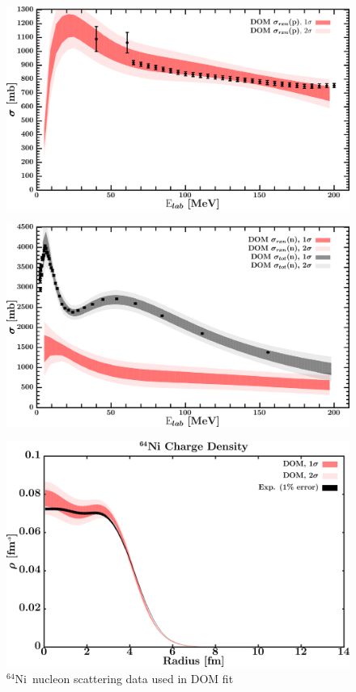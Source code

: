 \documentclass[twocolumn,secnumarabic,amssymb, nobibnotes, aps, prl,
superscriptaddress, nobalancelastpage, draft]{revtex4}
\newcommand{\niFour}{\ensuremath{^{64}}N\lowercase{i}}
\begin{document}
\begin{figure}[!htb]
\begin{minipage}{0.4\linewidth}
        \includegraphics[width=\linewidth]{figures/ni64_protonInelastic.png}
        \label{DOM_ni64_proton_inelastic}
    \end{minipage}\hspace{6pt}
    \begin{minipage}{0.4\linewidth}
        \centering
        \includegraphics[width=\linewidth]{figures/ni64_neutronInelastic.png}
        \label{DOM_ni64_neutron_inelastic}
    \end{minipage}
    \caption{\niFour\ nucleon scattering data used in DOM fit}
    \label{DOM_ni64_scattering}
    \centering
    \begin{minipage}{0.4\linewidth}
        \centering
        \includegraphics[width=\linewidth]{figures/ni64_chargeDensity.png}

\end{minipage}
\end{figure}
\end{document}
